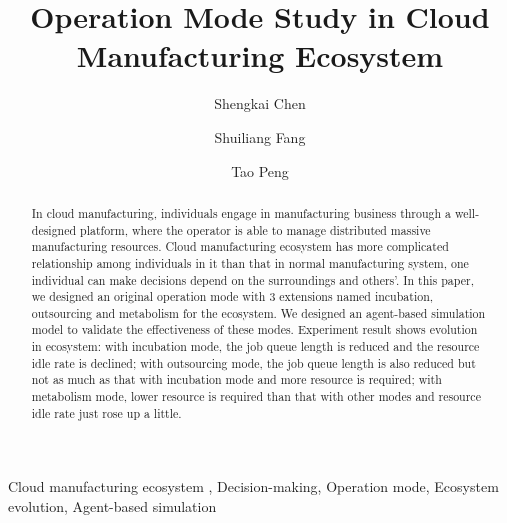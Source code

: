 
\title{Operation Mode Study in Cloud Manufacturing Ecosystem
}

\author[add1]{Shengkai Chen}
\author[add2,add1]{Shuiliang Fang}
\author[add2,add1]{Tao Peng}
\address[add2]{The State Key Laboratory of Fluid Power Transmission and Control, College of Mechanical Engineering, Zhejiang University, Hangzhou, 310027, China}
\address[add1]{Key Laboratory of Advanced Manufacturing Technology of Zhejiang Province, College of Mechanical Engineering, Zhejiang University, Hangzhou , 310027, China}



\begin{abstract}
In cloud manufacturing, individuals engage in manufacturing business through a well-designed platform, where the operator is able to manage distributed massive manufacturing resources.
Cloud manufacturing ecosystem has more complicated relationship among individuals in it than that in normal manufacturing system, one individual can make decisions depend on the surroundings and others'. In this paper, we designed an original operation mode with 3 extensions named incubation, outsourcing and metabolism for the ecosystem. We designed an agent-based simulation model to validate the effectiveness of these modes. Experiment result shows evolution in ecosystem: with incubation mode, the job queue length is reduced and the resource idle rate is declined; with outsourcing mode, the job queue length is also reduced but not as much as that with incubation mode and more resource is required; with metabolism mode, lower resource is required than that with other modes and resource idle rate just rose up a little.

\end{abstract}

\begin{keyword}
Cloud manufacturing ecosystem \sep
Decision-making\sep
Operation mode\sep
Ecosystem evolution\sep
Agent-based simulation

\end{keyword}
